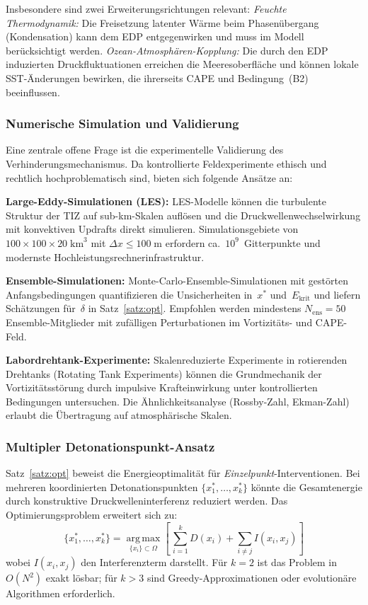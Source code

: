 ﻿\documentclass[a4paper,12pt]{article}
\theoremstyle{definition}
\begin{document}
Insbesondere sind zwei Erweiterungsrichtungen relevant:
\emph{Feuchte Thermodynamik:} Die Freisetzung latenter W\"{a}rme beim
Phasen\"{u}bergang (Kondensation) kann dem EDP entgegenwirken
und muss im Modell ber\"{u}cksichtigt werden.
\emph{Ozean-Atmosph\"{a}ren-Kopplung:} Die durch den EDP induzierten
Druckfluktuationen erreichen die Meeresoberfl\"{a}che und k\"{o}nnen
lokale SST-\"{A}nderungen bewirken, die ihrerseits CAPE und Bedingung~(B2)
beeinflussen.

\subsubsection{Numerische Simulation und Validierung}

Eine zentrale offene Frage ist die experimentelle Validierung des
Verhinderungsmechanismus.
Da kontrollierte Feldexperimente ethisch und rechtlich hochproblematisch sind,
bieten sich folgende Ans\"{a}tze an:

\textbf{Large-Eddy-Simulationen (LES):}
LES-Modelle k\"{o}nnen die turbulente Struktur der TIZ auf sub-km-Skalen
aufl\"{o}sen und die Druckwellenwechselwirkung mit konvektiven Updrafts
direkt simulieren.
Simulationsgebiete von $100\times100\times20\;\mathrm{km}^{3}$
mit $\Delta x\leq 100\;\mathrm{m}$ erfordern ca.\ $10^{9}$~Gitterpunkte
und modernste Hochleistungsrechnerinfrastruktur.

\textbf{Ensemble-Simulationen:}
Monte-Carlo-Ensemble-Simulationen mit gestörten Anfangsbedingungen
quantifizieren die Unsicherheiten in~$x^{*}$ und~$E_{\mathrm{krit}}$
und liefern Sch\"{a}tzungen f\"{u}r~$\delta$ in Satz~\ref{satz:opt}.
Empfohlen werden mindestens $N_{\mathrm{ens}}=50$ Ensemble-Mitglieder
mit zuf\"{a}lligen Perturbationen im Vortizit\"{a}ts- und CAPE-Feld.

\textbf{Labordrehtank-Experimente:}
Skalenreduzierte Experimente in rotierenden Drehtanks
(Rotating Tank Experiments) k\"{o}nnen die Grundmechanik der
Vortizit\"{a}tsst\"{o}rung durch impulsive Krafteinwirkung unter
kontrollierten Bedingungen untersuchen.
Die \"{A}hnlichkeitsanalyse (Rossby-Zahl, Ekman-Zahl) erlaubt
die \"{U}bertragung auf atmosph\"{a}rische Skalen.

\subsubsection{Multipler Detonationspunkt-Ansatz}

Satz~\ref{satz:opt} beweist die Energieoptimalit\"{a}t f\"{u}r
\emph{Einzelpunkt}-Interventionen.
Bei mehreren koordinierten Detonationspunkten
$\{x_{1}^{*},\ldots,x_{k}^{*}\}$ k\"{o}nnte die Gesamtenergie durch
konstruktive Druckwelleninterferenz reduziert werden.
Das Optimierungsproblem erweitert sich zu:
\[
    \{x_{1}^{*},\ldots,x_{k}^{*}\}
    =\operatorname*{arg\,max}_{\{x_{i}\}\subset\Omega}
    \left[\,\sum_{i=1}^{k}D(x_{i})+\sum_{i\neq j}I(x_{i},x_{j})\right]
\]
wobei $I(x_{i},x_{j})$ den Interferenzterm darstellt.
F\"{u}r $k=2$ ist das Problem in $O(N^{2})$ exakt l\"{o}sbar;
f\"{u}r $k>3$ sind Greedy-Approximationen oder evolution\"{a}re
Algorithmen erforderlich.
\end{document}
